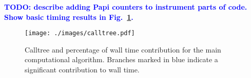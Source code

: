 \documentclass[11pt,a4paper]{article}
\newcommand{\todo}[1]{\textbf{\textcolor{Blue}{TODO: #1}}} %
\newcommand{\fig}[1]{Fig.~\ref{#1}} %
\begin{document}
\todo{describe adding Papi counters to instrument parts of code. Show basic timing results in \fig{fig:calltree}.}

\begin{figure}[htp!]
\centering
\texttt{[image: ./images/calltree.pdf]}
\caption{Calltree and percentage of wall time contribution for the main computational algorithm. Branches marked in blue indicate a significant contribution to wall time.}
\label{fig:calltree}
\end{figure}
\end{document}
